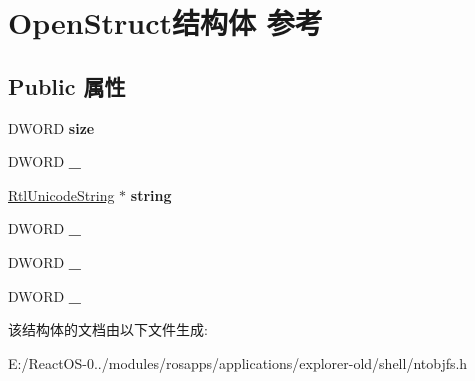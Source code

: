 \hypertarget{struct_open_struct}{}\section{Open\+Struct结构体 参考}
\label{struct_open_struct}
\subsection*{Public 属性}
\begin{DoxyCompactItemize}
\item 
\mbox{\label{struct_open_struct_aa5ccb951f12a3b90654ce2e892474f3b}} 
D\+W\+O\+RD {\bfseries size}
\item 
\mbox{\label{struct_open_struct_acb7162fc6a8c2a608e2333c07fb33986}} 
D\+W\+O\+RD {\bfseries \+\_}
\item 
\mbox{\label{struct_open_struct_a965c088da814a9ae053eda970b9dec15}} 
\hyperlink{struct_rtl_unicode_string}{Rtl\+Unicode\+String} $\ast$ {\bfseries string}
\item 
\mbox{\label{struct_open_struct_a004ffa053166d12dec7780c8fb25f0a1}} 
D\+W\+O\+RD {\bfseries \+\_}
\item 
\mbox{\label{struct_open_struct_ae8be80e74a290e41a0565c325657cae4}} 
D\+W\+O\+RD {\bfseries \+\_}
\item 
\mbox{\label{struct_open_struct_a35a0de35ba88a0b0dec1191b64056cbe}} 
D\+W\+O\+RD {\bfseries \+\_}
\end{DoxyCompactItemize}


该结构体的文档由以下文件生成\+:\begin{DoxyCompactItemize}
\item 
E\+:/\+React\+O\+S-\/0../modules/rosapps/applications/explorer-\/old/shell/ntobjfs.\+h\end{DoxyCompactItemize}
